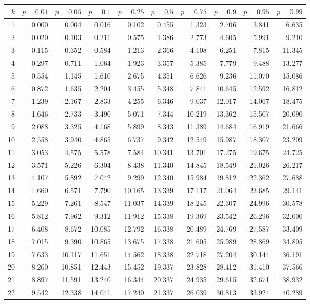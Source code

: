 \begin{table}[h]
\begin{center}
\footnotesize
\begin{tabular}{|r|rrr|rrr|rrr|}
\hline
\strut$k$&$p=0.01$&$p=0.05$&$p=0.1$&$p=0.25$&$p=0.5$&$p=0.75$&$p=0.9$&$p=0.95$&$p=0.99$\\
\hline
1&0.000&0.004&0.016&0.102&0.455&1.323&2.706&3.841&6.635\\
2&0.020&0.103&0.211&0.575&1.386&2.773&4.605&5.991&9.210\\
3&0.115&0.352&0.584&1.213&2.366&4.108&6.251&7.815&11.345\\
4&0.297&0.711&1.064&1.923&3.357&5.385&7.779&9.488&13.277\\
5&0.554&1.145&1.610&2.675&4.351&6.626&9.236&11.070&15.086\\
6&0.872&1.635&2.204&3.455&5.348&7.841&10.645&12.592&16.812\\
7&1.239&2.167&2.833&4.255&6.346&9.037&12.017&14.067&18.475\\
8&1.646&2.733&3.490&5.071&7.344&10.219&13.362&15.507&20.090\\
9&2.088&3.325&4.168&5.899&8.343&11.389&14.684&16.919&21.666\\
10&2.558&3.940&4.865&6.737&9.342&12.549&15.987&18.307&23.209\\
11&3.053&4.575&5.578&7.584&10.341&13.701&17.275&19.675&24.725\\
12&3.571&5.226&6.304&8.438&11.340&14.845&18.549&21.026&26.217\\
13&4.107&5.892&7.042&9.299&12.340&15.984&19.812&22.362&27.688\\
14&4.660&6.571&7.790&10.165&13.339&17.117&21.064&23.685&29.141\\
15&5.229&7.261&8.547&11.037&14.339&18.245&22.307&24.996&30.578\\
16&5.812&7.962&9.312&11.912&15.338&19.369&23.542&26.296&32.000\\
17&6.408&8.672&10.085&12.792&16.338&20.489&24.769&27.587&33.409\\
18&7.015&9.390&10.865&13.675&17.338&21.605&25.989&28.869&34.805\\
19&7.633&10.117&11.651&14.562&18.338&22.718&27.204&30.144&36.191\\
20&8.260&10.851&12.443&15.452&19.337&23.828&28.412&31.410&37.566\\
21&8.897&11.591&13.240&16.344&20.337&24.935&29.615&32.671&38.932\\
22&9.542&12.338&14.041&17.240&21.337&26.039&30.813&33.924&40.289\\

\end{tabular}
\end{center}
\end{table}
